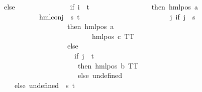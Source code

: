 \begin{isabellebody}
\ \ \ \ \ \ \ \ \ \ \ \ else\ \isanewline
\ \ \ \ \ \ \ \ \ \ \ \ \ \ {\isacharparenleft}{\kern0pt}if\ i\ {\isacharequal}{\kern0pt}\ t\ \ \isanewline
\ \ \ \ \ \ \ \ \ \ \ \ \ \ \ then\ {\isacharparenleft}{\kern0pt}hml{\isacharunderscore}{\kern0pt}pos\ a\ \isanewline
\ \ \ \ \ \ \ \ \ \ \ \ \ \ \ \ \ \ \ \ \ \ {\isacharparenleft}{\kern0pt}hml{\isacharunderscore}{\kern0pt}conj\ {\isacharbraceleft}{\kern0pt}{\isacharbraceright}{\kern0pt}\ {\isacharbraceleft}{\kern0pt}s{\isacharcomma}{\kern0pt}\ t{\isacharbraceright}{\kern0pt}\ \isanewline
\ \ \ \ \ \ \ \ \ \ \ \ \ \ \ \ \ \ \ \ \ \ \ \ {\isacharparenleft}{\kern0pt}{\isasymlambda}j{\isachardot}{\kern0pt}\ {\isacharparenleft}{\kern0pt}if\ j\ {\isacharequal}{\kern0pt}\ s\ \isanewline
\ \ \ \ \ \ \ \ \ \ \ \ \ \ \ \ \ \ \ \ \ \ \ \ \ \ \ \ \ \ then\ {\isacharparenleft}{\kern0pt}hml{\isacharunderscore}{\kern0pt}pos\ a\ \isanewline
\ \ \ \ \ \ \ \ \ \ \ \ \ \ \ \ \ \ \ \ \ \ \ \ \ \ \ \ \ \ \ \ \ \ \ \ \ {\isacharparenleft}{\kern0pt}hml{\isacharunderscore}{\kern0pt}pos\ c\ TT{\isacharparenright}{\kern0pt}{\isacharparenright}{\kern0pt}\ \isanewline
\ \ \ \ \ \ \ \ \ \ \ \ \ \ \ \ \ \ \ \ \ \ \ \ \ \ \ \ \ \ else\ \isanewline
\ \ \ \ \ \ \ \ \ \ \ \ \ \ \ \ \ \ \ \ \ \ \ \ \ \ \ \ \ \ \ \ {\isacharparenleft}{\kern0pt}if\ j\ {\isacharequal}{\kern0pt}\ t\ \isanewline
\ \ \ \ \ \ \ \ \ \ \ \ \ \ \ \ \ \ \ \ \ \ \ \ \ \ \ \ \ \ \ \ \ then\ {\isacharparenleft}{\kern0pt}hml{\isacharunderscore}{\kern0pt}pos\ b\ TT{\isacharparenright}{\kern0pt}\ \isanewline
\ \ \ \ \ \ \ \ \ \ \ \ \ \ \ \ \ \ \ \ \ \ \ \ \ \ \ \ \ \ \ \ \ else\ undefined{\isacharparenright}{\kern0pt}{\isacharparenright}{\kern0pt}{\isacharparenright}{\kern0pt}{\isacharparenright}{\kern0pt}{\isacharparenright}{\kern0pt}\isanewline
\ \ \ \ \ \ \ \ \ \ \ \ \ \ \ else\ undefined{\isacharparenright}{\kern0pt}{\isacharparenright}{\kern0pt}{\isacharparenright}{\kern0pt}{\isacharparenright}{\kern0pt}\ {\isacharbackquote}{\kern0pt}\ {\isacharbraceleft}{\kern0pt}s{\isacharcomma}{\kern0pt}\ t{\isacharbraceright}{\kern0pt}{\isacharparenright}{\kern0pt}{\isacharparenright}{\kern0pt}\ {\isacharequal}{\kern0pt}\ {}{\isachardoublequoteclose}\isanewline
\ \ \ \ \ \ \ \ \isamarkupfalse%

\end{isabellebody}
